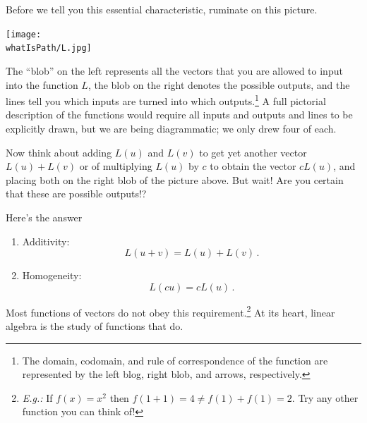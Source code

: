 Before we tell you this essential characteristic, 
ruminate on this picture. 

\begin{center}
\texttt{[image: \\whatIsPath/L.jpg]}
\end{center}

The ``blob'' on the left represents all the vectors that you are allowed to input into the function $L$,  the blob on the right denotes the
possible outputs, and the lines tell you which inputs are turned into which outputs.\footnote{The domain, codomain, and rule of correspondence of the function are represented by the left blog, right blob, and arrows, respectively.} A full pictorial description of the functions would require all inputs and outputs and lines to be explicitly drawn, but we are being diagrammatic; we only drew four of each.  




Now think about adding $L(u)$ and $L(v)$ to get yet another vector $L(u)+L(v)$ or of multiplying $L(u)$ by $c$ to obtain the vector $cL(u)$, and placing both on the right blob of the picture above. 
But wait! Are you certain that these are possible outputs!?

Here's the answer 
\begin{center}
\end{center}
\begin{enumerate}
\item Additivity:
$$L(u+v)=L(u)+L(v)\, .$$
\item Homogeneity:
$$L(cu)=cL(u)\, .$$
\end{enumerate}

\noindent Most functions of vectors do not obey this requirement.\!\footnote{{\it E.g.:} If $f(x)=x^2$ then $f(1+1)=4 \neq f(1)+f(1)=2$. Try any other function you can think of!}  At its heart, linear algebra is the study of functions that do. 

